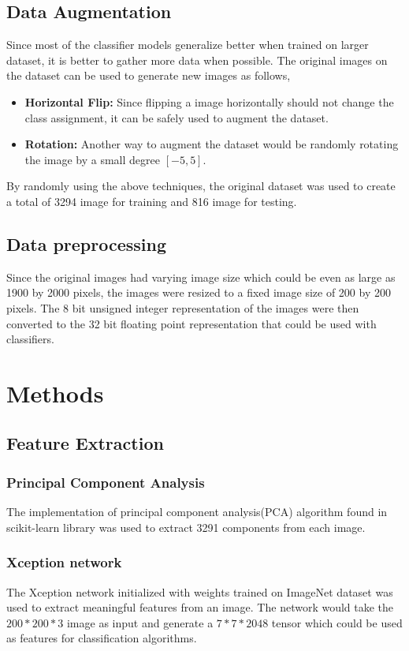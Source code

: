 \documentclass[12pt]{article}
\begin{document}
\subsection{Data Augmentation}
Since most of the classifier models generalize better when trained on larger dataset,
it is better to gather more data when possible. The original images on the dataset can be used
to generate new images as follows,

\begin{itemize}
    \item \textbf{Horizontal Flip:} Since flipping a image horizontally should not change the class assignment, it can be safely used to augment the dataset.
    \item \textbf{Rotation:} Another way to augment the dataset would be randomly rotating the image by a small degree $[-5, 5]$.
\end{itemize}

By randomly using the above techniques, the original dataset was used to create a total of 3294 image for training and 
816 image for testing.

\subsection{Data preprocessing}
Since the original images had varying image size which could be even as large as 1900 by 2000 pixels, the images were resized to a fixed image size of
200 by 200 pixels. The 8 bit unsigned integer representation of the images were then converted to the 32 bit floating point representation that could be used with
classifiers.

\section{Methods}

\subsection{Feature Extraction}
\subsubsection{Principal Component Analysis}
The implementation of principal component analysis(PCA) algorithm found in scikit-learn\cite{pedregosa2011scikit} library was used to extract 3291 components from each image.

\subsubsection{Xception network}
The Xception\cite{chollet2017xception} network initialized with weights trained on ImageNet dataset was used to extract meaningful features from an image.
The network would take the $200 * 200 * 3$ image as input and generate a $7 * 7 * 2048$ tensor which could be used as features for classification algorithms.
\end{document}
